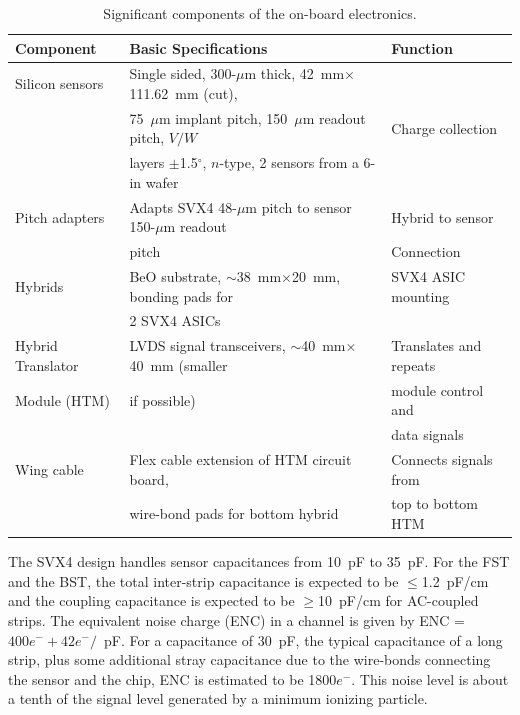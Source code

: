\begin{table}[htbp]
\begin{center}
\begin{small}
\begin{tabular}{|l|l|l|} \hline
Component       & Basic Specifications & Function \\ \hline
Silicon sensors & Single sided, 300-$\mu$m thick, 42~mm$\times$111.62~mm (cut),
 &   \\
                & 75~$\mu$m implant pitch, 150~$\mu$m readout pitch, $V/W$ & Charge collection \\
                & layers $\pm$1.5$^\circ$, $n$-type, 2 sensors from a 6-in wafer &  \\ \hline
Pitch adapters  & Adapts SVX4 48-$\mu$m pitch to sensor 150-$\mu$m readout 
 & Hybrid to sensor \\
                & pitch       & Connection \\ \hline
Hybrids         & BeO substrate, $\sim$38~mm$\times$20~mm, bonding pads for 
  & SVX4 ASIC mounting\\
                & 2 SVX4 ASICs &  \\ \hline
Hybrid Translator & LVDS signal transceivers, $\sim$40~mm$\times$40~mm 
(smaller & Translates and repeats \\
Module (HTM)    & if possible)            & module control and \\
                &                         & data signals \\ \hline
Wing cable & Flex cable extension of HTM circuit board, & Connects signals from \\
                & wire-bond pads for bottom hybrid & top to bottom HTM \\ \hline
\end{tabular}
\end{small}
\end{center}
\caption{\small{Significant components of the on-board electronics.}}
\label{tab:onboard-electronics}
\end{table}

The SVX4 design handles sensor capacitances from 10~pF to 35~pF.  For the
FST and the BST, the total inter-strip capacitance is expected to be
$\le$1.2~pF/cm and the coupling capacitance is expected to be
$\ge$10~pF/cm for AC-coupled strips.  The equivalent noise charge (ENC) in 
a channel is given by ENC = $400 e^- + 42 e^-/$~pF.  For a capacitance of 
30~pF, the typical capacitance of a long strip, plus some additional stray 
capacitance due to the wire-bonds connecting the sensor and the chip, ENC 
is estimated to be 1800$e^-$.  This noise level is about a tenth of the 
signal level generated by a minimum ionizing particle.


